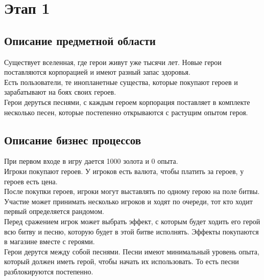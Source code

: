 \section*{Этап 1}


\subsection*{Описание предметной области}

Существует вселенная, где герои живут уже тысячи лет. Новые герои поставляются корпорацией и имеют разный запас здоровья.\\

Есть пользователи, те инопланетные существа, которые покупают героев и зарабатывают на боях своих героев.\\

Герои деруться песнями, с каждым героем корпорация поставляет в комплекте несколько песен, которые постепенно открываются с растущим опытом героя.


\subsection*{Описание бизнес процессов}


При первом входе в игру дается 1000 золота и 0 опыта.\\
    
Игроки покупают героев. У игроков есть валюта, чтобы платить за героев, у героев есть цена.\\

После покупки героев, игроки могут выставлять по одному герою на поле битвы. Участие может принимать несколько игроков и ходят по очереди, тот кто ходит первый определяется рандомом.\\

Перед сражением игрок может выбрать эффект, с которым будет ходить его герой всю битву и песню, которую будет в этой битве исполнять.  Эффекты покупаются в магазине вместе с героями.  \\

Герои дерутся между собой песнями. Песни имеют минимальный уровень опыта, который должен иметь герой, чтобы начать их использовать. То есть песни разблокируются постепенно.\\
    
